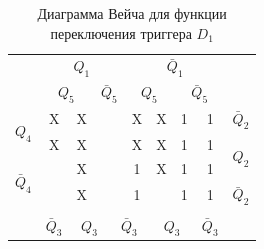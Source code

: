 \documentclass[a4paper,14pt]{article}
\begin{document}
\begin{table}[H]
	\begin{center}
		\caption{\label{tab:D1_tab} Диаграмма Вейча для функции переключения триггера $D_1$ }
		\begin{tabular}{cccccccccc}
			& \multicolumn{4}{c}{$Q_1$} & \multicolumn{4}{c}{$\bar{Q}_1$} &  \\
			& \multicolumn{2}{c}{$Q_5$} & \multicolumn{2}{c}{$\bar{Q}_5$} & \multicolumn{2}{c}{$Q_5$} & \multicolumn{2}{c}{$\bar{Q}_5$} &  \\ \cline{2-9}
			\multicolumn{1}{c|}{\multirow{2}{*}{$Q_4$}} & \multicolumn{1}{c|}{X} & \multicolumn{1}{c|}{X} & \multicolumn{1}{c|}{} & \multicolumn{1}{c|}{} & \multicolumn{1}{c|}{X} & \multicolumn{1}{c|}{X} & \multicolumn{1}{c|}{1} & \multicolumn{1}{c|}{1} & $\bar{Q}_2$ \\ \cline{2-9}
			\multicolumn{1}{c|}{} & \multicolumn{1}{c|}{X} & \multicolumn{1}{c|}{X} & \multicolumn{1}{c|}{} & \multicolumn{1}{c|}{} & \multicolumn{1}{c|}{X} & \multicolumn{1}{c|}{X} & \multicolumn{1}{c|}{1} & \multicolumn{1}{c|}{1} & \multirow{2}{*}{$Q_2$} \\ \cline{2-9}
			\multicolumn{1}{c|}{\multirow{2}{*}{$\bar{Q}_4$}} & \multicolumn{1}{c|}{} & \multicolumn{1}{c|}{X} & \multicolumn{1}{c|}{} & \multicolumn{1}{c|}{} & \multicolumn{1}{c|}{1} & \multicolumn{1}{c|}{X} & \multicolumn{1}{c|}{1} & \multicolumn{1}{c|}{1} &  \\ \cline{2-9}
			\multicolumn{1}{c|}{} & \multicolumn{1}{c|}{} & \multicolumn{1}{c|}{X} & \multicolumn{1}{c|}{} & \multicolumn{1}{c|}{} & \multicolumn{1}{c|}{1} & \multicolumn{1}{c|}{} & \multicolumn{1}{c|}{1} & \multicolumn{1}{c|}{1} & $\bar{Q}_2$ \\ \cline{2-9}
			&  & \multicolumn{2}{c}{} & \multicolumn{2}{c}{} & \multicolumn{2}{c}{} &  &  \\
			& $\bar{Q}_3$ & \multicolumn{2}{c}{$Q_3$} & \multicolumn{2}{c}{$\bar{Q}_3$} & \multicolumn{2}{c}{$Q_3$} & $\bar{Q}_3$ & 
		\end{tabular}
	\end{center}
\end{table}

\end{document}
